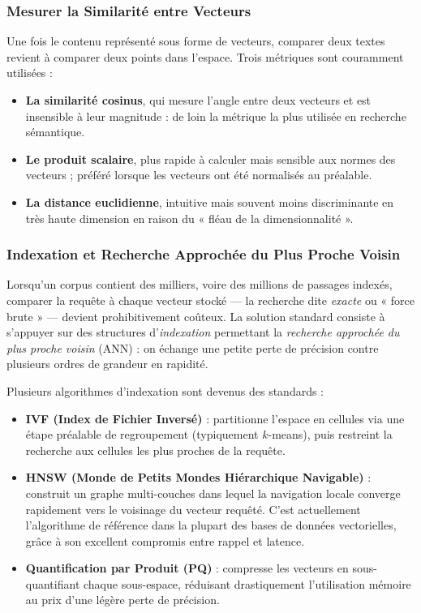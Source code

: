 \documentclass[a4paper,11pt]{article}
\begin{document}
\subsubsection{Mesurer la Similarité entre Vecteurs}

Une fois le contenu représenté sous forme de vecteurs, comparer deux textes
revient à comparer deux points dans l'espace. Trois métriques sont
couramment utilisées :

\begin{itemize}
  \item \textbf{La similarité cosinus}, qui mesure l'angle entre deux
    vecteurs et est insensible à leur magnitude : de loin la métrique la
    plus utilisée en recherche sémantique.
  \item \textbf{Le produit scalaire}, plus rapide à calculer mais sensible
    aux normes des vecteurs ; préféré lorsque les vecteurs ont été normalisés
    au préalable.
  \item \textbf{La distance euclidienne}, intuitive mais souvent moins
    discriminante en très haute dimension en raison du « fléau de la
    dimensionnalité ».
\end{itemize}

\subsubsection{Indexation et Recherche Approchée du Plus Proche Voisin}

Lorsqu'un corpus contient des milliers, voire des millions de passages
indexés, comparer la requête à chaque vecteur stocké --- la recherche dite
\emph{exacte} ou « force brute » --- devient prohibitivement coûteux. La
solution standard consiste à s'appuyer sur des structures d'\emph{indexation}
permettant la \emph{recherche approchée du plus proche voisin} (ANN) : on
échange une petite perte de précision contre plusieurs ordres de grandeur en
rapidité.

Plusieurs algorithmes d'indexation sont devenus des standards :

\begin{itemize}
  \item \textbf{IVF (Index de Fichier Inversé)} : partitionne l'espace en
    cellules via une étape préalable de regroupement (typiquement $k$-means),
    puis restreint la recherche aux cellules les plus proches de la requête.
  \item \textbf{HNSW (Monde de Petits Mondes Hiérarchique Navigable)}
    \cite{malkov2018hnsw} : construit un graphe multi-couches dans lequel la
    navigation locale converge rapidement vers le voisinage du vecteur
    requêté. C'est actuellement l'algorithme de référence dans la plupart des
    bases de données vectorielles, grâce à son excellent compromis entre
    rappel et latence.
  \item \textbf{Quantification par Produit (PQ)} : compresse les vecteurs
    en sous-quantifiant chaque sous-espace, réduisant drastiquement
    l'utilisation mémoire au prix d'une légère perte de précision.
\end{itemize}
\end{document}
